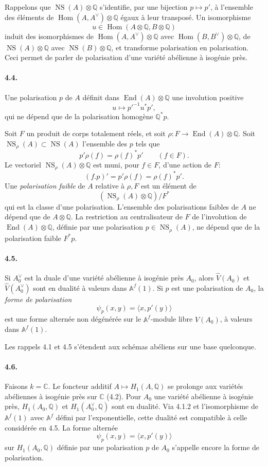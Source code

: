 \documentclass[10pt]{article}
\newcommand{\Af}{\mathbb A^f}
\newcommand{\C}{\mathbb C}
\newcommand{\Q}{\mathbb Q}
\newcommand{\Hom}{\operatorname{Hom}}
\newcommand{\End}{\operatorname{End}}
\newcommand{\NS}{\operatorname{NS}}
\begin{document}
Rappelons que $\NS(A)\otimes\Q$ s'identifie, par une bijection $p\mapsto p'$, à l'ensemble des éléments de $\Hom(A,A^\vee)\otimes\Q$ égaux à leur transposé. Un isomorphisme
\[
u\in\Hom(A\otimes\Q,B\otimes\Q)
\]
induit des isomorphismes de $\Hom(A,A^\vee)\otimes\Q$ avec $\Hom(B,B^\vee)\otimes\Q$, de $\NS(A)\otimes\Q$ avec $\NS(B)\otimes\Q$, et transforme polarisation en polarisation. Ceci permet de parler de polarisation d'une variété abélienne à isogénie près.

\paragraph{4.4.} Une polarisation $p$ de $A$ définit dans $\End(A)\otimes\Q$ une involution positive
\[
u\longmapsto p'^{-1}u^*p',
\]
qui ne dépend que de la polarisation homogène $\Q^*p$.

Soit $F$ un produit de corps totalement réels, et soit $\rho:F\longrightarrow\End(A)\otimes\Q$. Soit $\NS_\rho(A)\subset\NS(A)$ l'ensemble des $p$ tels que
\[
p'\rho(f)=\rho(f)^*p'\qquad(f\in F).
\]
Le vectoriel $\NS_\rho(A)\otimes\Q$ est muni, pour $f\in F$, d'une action de $F$:
\[
(f.p)'=p'\rho(f)=\rho(f)^*p'.
\]
Une \emph{polarisation faible} de $A$ relative à $\rho,F$ est un élément de
\[
(\NS_\rho(A)\otimes\Q)/F^*
\]
qui est la classe d'une polarisation. L'ensemble des polarisations faibles de $A$ ne dépend que de $A\otimes\Q$. La restriction au centralisateur de $F$ de l'involution de $\End(A)\otimes\Q$, définie par une polarisation $p\in\NS_\rho(A)$, ne dépend que de la polarisation faible $F^*p$.

\paragraph{4.5.} Si $A_0^\vee$ est la duale d'une variété abélienne à isogénie près $A_0$, alors $\widehat V(A_0)$ et $\widehat V(A_0^\vee)$ sont en dualité à valeurs dans $\Af(1)$. Si $p$ est une polarisation de $A_0$, la \emph{forme de polarisation}
\[
\psi_p(x,y)=\langle x,p'(y)\rangle
\]
est une forme alternée non dégénérée sur le $\Af$-module libre $\widehat V(A_0)$, à valeurs dans $\Af(1)$.

Les rappels 4.1 et 4.5 s'étendent aux schémas abéliens sur une base quelconque.

\paragraph{4.6.} Faisons $k=\C$. Le foncteur additif $A\mapsto H_1(A,\Q)$ se prolonge aux variétés abéliennes à isogénie près sur $\C$ (4.2). Pour $A_0$ une variété abélienne à isogénie près, $H_1(A_0,\Q)$ et $H_1(A_0^\vee,\Q)$ sont en dualité. Via 4.1.2 et l'isomorphisme de $\Af(1)$ avec $\Af$ défini par l'exponentielle, cette dualité est compatible à celle considérée en 4.5. La forme alternée
\[
\psi_p(x,y)=\langle x,p'(y)\rangle
\]
sur $H_1(A_0,\Q)$ définie par une polarisation $p$ de $A_0$ s'appelle encore la forme de polarisation.
\end{document}
